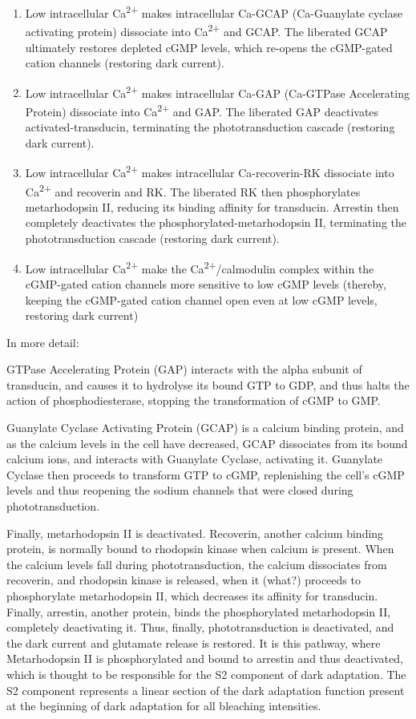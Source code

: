 \begin{enumerate}
\def\labelenumi{\arabic{enumi}.}
\tightlist
\item
  Low intracellular Ca\textsuperscript{2+} makes intracellular Ca-GCAP (Ca-Guanylate cyclase activating protein) dissociate into Ca\textsuperscript{2+} and GCAP. The liberated GCAP ultimately restores depleted cGMP levels, which re-opens the cGMP-gated cation channels (restoring dark current).
\item
  Low intracellular Ca\textsuperscript{2+} makes intracellular Ca-GAP (Ca-GTPase Accelerating Protein) dissociate into Ca\textsuperscript{2+} and GAP. The liberated GAP deactivates activated-transducin, terminating the phototransduction cascade (restoring dark current).
\item
  Low intracellular Ca\textsuperscript{2+} makes intracellular Ca-recoverin-RK dissociate into Ca\textsuperscript{2+} and recoverin and RK. The liberated RK then phosphorylates metarhodopsin II, reducing its binding affinity for transducin. Arrestin then completely deactivates the phosphorylated-metarhodopsin II, terminating the phototransduction cascade (restoring dark current).
\item
  Low intracellular Ca\textsuperscript{2+} make the Ca\textsuperscript{2+}/calmodulin complex within the cGMP-gated cation channels more sensitive to low cGMP levels (thereby, keeping the cGMP-gated cation channel open even at low cGMP levels, restoring dark current)
\end{enumerate}

In more detail:

GTPase Accelerating Protein (GAP) interacts with the alpha subunit of transducin, and causes it to hydrolyse its bound GTP to GDP, and thus halts the action of phosphodiesterase, stopping the transformation of cGMP to GMP.

Guanylate Cyclase Activating Protein (GCAP) is a calcium binding protein, and as the calcium levels in the cell have decreased, GCAP dissociates from its bound calcium ions, and interacts with Guanylate Cyclase, activating it. Guanylate Cyclase then proceeds to transform GTP to cGMP, replenishing the cell's cGMP levels and thus reopening the sodium channels that were closed during phototransduction.

Finally, metarhodopsin II is deactivated. Recoverin, another calcium binding protein, is normally bound to rhodopsin kinase when calcium is present. When the calcium levels fall during phototransduction, the calcium dissociates from recoverin, and rhodopsin kinase is released, when it (what?) proceeds to phosphorylate metarhodopsin II, which decreases its affinity for transducin. Finally, arrestin, another protein, binds the phosphorylated metarhodopsin II, completely deactivating it. Thus, finally, phototransduction is deactivated, and the dark current and glutamate release is restored. It is this pathway, where Metarhodopsin II is phosphorylated and bound to arrestin and thus deactivated, which is thought to be responsible for the S2 component of dark adaptation. The S2 component represents a linear section of the dark adaptation function present at the beginning of dark adaptation for all bleaching intensities.

